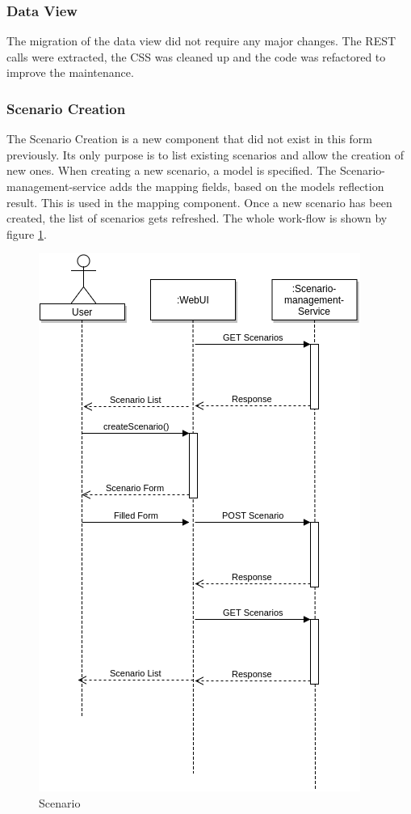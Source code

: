 \subsubsection{Data View}
The migration of the data view did not require any major changes. The REST calls were extracted, the CSS was cleaned up and the code was refactored to improve the maintenance.

\subsubsection{Scenario Creation}
The Scenario Creation is a new component that did not exist in this form previously. Its only purpose is to list existing scenarios and allow the creation of new ones. When creating a new scenario, a model is specified. The Scenario-management-service adds the mapping fields, based on the models reflection result. This is used in the mapping component. Once a new scenario has been created, the list of scenarios gets refreshed. The whole work-flow is shown by figure \ref{fig:scenario}.
\begin{figure}[H]
	\centering\includegraphics[width=.60\textwidth]{res/Scenario}
	\caption{Scenario}
	\label{fig:scenario}
\end{figure}


